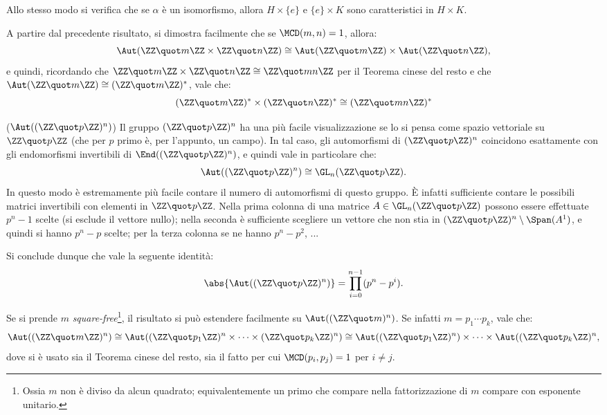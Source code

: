 \documentclass[12pt]{scrartcl}
\begin{document}
	
	Allo stesso modo si verifica che se $\alpha$ è un isomorfismo, allora
	$H \times \{e\}$ e $\{e\} \times K$ sono caratteristici in $H \times K$. \medskip
	
	
	A partire dal precedente risultato, si dimostra facilmente che se $\MCD(m, n) = 1$,
	allora:
	\[ \Aut(\ZZ \quot m \ZZ \times \ZZ \quot n \ZZ) \cong \Aut(\ZZ \quot m \ZZ) \times \Aut(\ZZ \quot n \ZZ), \]
	e quindi, ricordando che $\ZZ \quot m \ZZ \times \ZZ \quot n \ZZ \cong \ZZ \quot mn \ZZ$
	per il Teorema cinese del resto e che $\Aut(\ZZ \quot m \ZZ) \cong (\ZZ \quot m \ZZ)^*$,
	vale che:
	\[ (\ZZ \quot m \ZZ)^* \times (\ZZ \quot n \ZZ)^* \cong (\ZZ \quot mn \ZZ)^* \]
	
	\begin{example}($\Aut((\ZZ \quot p \ZZ)^n)$)
		Il gruppo $(\ZZ \quot p \ZZ)^n$ ha una più facile
		visualizzazione se lo si pensa come spazio vettoriale su
		$\ZZ \quot p \ZZ$ (che per $p$ primo è, per l'appunto,
		un campo). In tal caso, gli automorfismi di
		$(\ZZ \quot p \ZZ)^n$ coincidono esattamente con gli
		endomorfismi invertibili di $\End((\ZZ \quot p \ZZ)^n)$,
		e quindi vale in particolare che:
		\[ \Aut((\ZZ \quot p \ZZ)^n) \cong \GL_n(\ZZ \quot p \ZZ). \]
		In questo modo è estremamente più facile contare il
		numero di automorfismi di questo gruppo. È infatti
		sufficiente contare le possibili matrici invertibili con
		elementi in $\ZZ \quot p \ZZ$. Nella prima colonna di una
		matrice $A \in \GL_n(\ZZ \quot p \ZZ)$ possono
		essere effettuate $p^n - 1$ scelte (si esclude il vettore
		nullo); nella seconda è sufficiente scegliere un vettore
		che non stia in $(\ZZ \quot p \ZZ)^n \setminus
		\Span(A^1)$, e quindi si hanno $p^n - p$ scelte; per la
		terza colonna se ne hanno $p^n - p^2$, ... \medskip
		
		
		Si conclude dunque che vale la seguente identità:
		\[ \abs{\Aut((\ZZ \quot p \ZZ)^n)} = \prod_{i=0}^{n-1} (p^n - p^i). \] \medskip
		
		
		Se si prende $m$ \textit{square-free}\footnote{
			Ossia $m$ non è diviso da alcun quadrato; equivalentemente
			un primo che compare nella fattorizzazione di $m$
			compare con esponente unitario.
		}, il risultato si può estendere facilmente
		su $\Aut((\ZZ \quot m)^n)$. Se infatti
		$m = p_1 \cdots p_k$, vale che:
		\[
			\Aut((\ZZ \quot m \ZZ)^n) \cong
			\Aut((\ZZ \quot p_1 \ZZ)^n \times \cdots \times (\ZZ \quot p_k \ZZ)^n)
			\cong \Aut((\ZZ \quot p_1 \ZZ)^n) \times
			\cdots \times \Aut((\ZZ \quot p_k \ZZ)^n,
		\]
		dove si è usato sia il Teorema cinese del resto, sia
		il fatto per cui $\MCD(p_i, p_j) = 1$ per $i \neq j$.
	\end{example}
	
\end{document}
